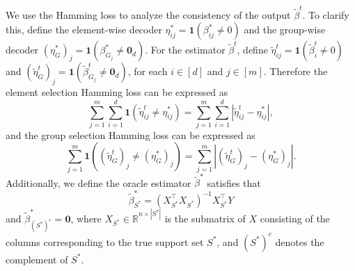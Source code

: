\documentclass[12pt]{article}
\begin{document}
We use the Hamming loss to analyze the consistency of the output $\tilde \beta^t$.
To clarify this, define the element-wise decoder $\eta^*_{ij} = \mathbf 1 (\beta^*_{ij} \ne 0)$ and the group-wise decoder $(\eta^*_G)_j = \mathbf1( \beta^*_{G_j} \ne \mathbf 0_d)$. 
For the estimator $\tilde\beta^t$, define $\tilde\eta^t_{ij} = \mathbf 1(\tilde\beta^t_{i} \ne 0)$ and $(\tilde\eta^t_G)_j = \mathbf 1( \tilde\beta^t_{G_j} \ne \mathbf 0_d)$, for each $i \in [d]$ and $j \in [m]$.
Therefore the element selection Hamming loss can be expressed as 
\begin{equation}\label{eq: eham}
 \sum_{j=1}^m \sum_{i=1}^{d} \mathbf 1\left(  \tilde \eta_{ij}^t \ne \eta_{ij}^* \right)=  \sum_{j=1}^m \sum_{i=1}^{d} | \tilde \eta_{ij}^t - \eta_{ij}^* |,
\end{equation}
and the group selection Hamming loss can be expressed as 
\begin{equation}\label{eq: gham}
\sum_{j=1}^m \mathbf1 \left( (\tilde \eta^t_G)_j \ne (\eta^*_G)_j \right) = \sum_{j=1}^m\left| (\tilde \eta^t_G)_j -(\eta^*_G)_j\right|.
\end{equation}
Additionally, we define the oracle estimator $\tilde \beta^*$ satisfies that $$\tilde \beta^*_{S^*} = (X_{S^*}^\top X_{S^*})^{-1} X_{S^*}^\top Y$$ and $\tilde \beta^*_{(S^*)^c} = \mathbf 0$, where $X_{S^*} \in \mathbb{R}^{n \times |S^*|}$ is the submatrix of $X$ consisting of the columns corresponding to the true support set $S^*$, and $(S^*)^c$ denotes the complement of $S^*$.
\end{document}
